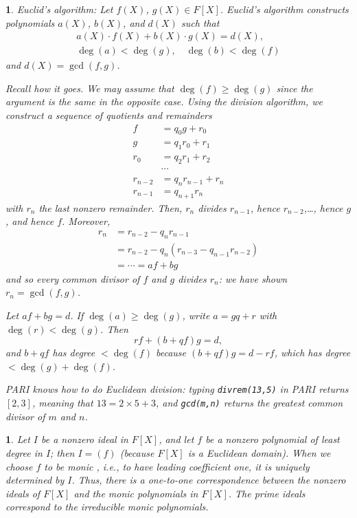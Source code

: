 \documentclass[a4paper,11pt,final,openany]{memoir}
\newtheorem{plain}[X]{}
\theoremstyle{nonumberplain}
\begin{document}
\begin{plain}
\label{ef3d}\emph{Euclid's algorithm}:%
Let $f(X)$, $g(X)\in F[X]$. Euclid's algorithm constructs polynomials $a(X)$,
$b(X)$, and $d(X)$ such that
\begin{align*}
a(X)\cdot f(X)+b(X)\cdot g(X)=d(X),\\
\deg(a)<\deg(g),\quad\deg(b)<\deg(f)
\end{align*}
and $d(X)=\gcd(f,g)$.

Recall how it goes. We may assume that $\deg(f)\geq\deg(g)$ since the argument
is the same in the opposite case. Using the division algorithm, we construct a
sequence of quotients and remainders
\begin{align*}
f  &  =q_{0}g+r_{0}\\
g  &  =q_{1}r_{0}+r_{1}\\
r_{0}  &  =q_{2}r_{1}+r_{2}\\
&  \cdots\\
r_{n-2}  &  =q_{n}r_{n-1}+r_{n}\\
r_{n-1}  &  =q_{n+1}r_{n}%
\end{align*}
with $r_{n}$ the last nonzero remainder. Then, $r_{n}$ divides $r_{n-1}$,
hence $r_{n-2}$,\ldots, hence $g$, and hence $f$. Moreover,
\begin{align*}
r_{n}&=r_{n-2}-q_{n}r_{n-1}\\
&=r_{n-2}-q_{n}(r_{n-3}-q_{n-1}r_{n-2})\\
&=\cdots=af+bg
\end{align*}
and so every common divisor of $f$ and $g$ divides $r_{n}$: we have shown
$r_{n}=\gcd(f,g)$.

Let $af+bg=d$. If $\deg(a)\geq\deg(g)$, write $a=gq+r$ with $\deg(r)<\deg(g)$.
Then
\[
rf+(b+qf)g=d,
\]
and $b+qf$ has degree $<\deg(f)$ because $(b+qf)g=d-rf$, which has degree
$<\deg(g)+\deg(f)$.

PARI%
knows how to do Euclidean division: typing \verb|divrem(13,5)| in PARI returns
$[2,3]$, meaning that $13=2\times5+3$, and \verb|gcd(m,n)| returns the
greatest common divisor of $m$ and $n$.
\end{plain}

\begin{plain}
\label{ef3e}Let $I$ be a nonzero ideal in $F[X]$, and let $f$ be a nonzero
polynomial of least degree in $I$; then $I=(f)$ (because $F[X]$ is a Euclidean
domain). When we choose $f$ to be \emph{monic}%
%
, i.e., to have leading coefficient one, it is uniquely determined by $I$.
Thus, there is a one-to-one correspondence between the nonzero ideals of
$F[X]$ and the monic polynomials in $F[X]$. The prime ideals correspond to the
irreducible monic polynomials.
\end{plain}
\end{document}
